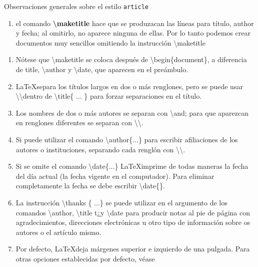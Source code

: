 \documentclass[12pt]{book}
\begin{document}
Observaciones generales sobre el estilo {\tt article}
\begin{multicols}{2}
\begin{enumerate}
    \item[\HandCuffRight] el comando {\bf \textbackslash maketitle} hace que se produzacan las líneas para título, author y fecha; al omitirlo, no aparece
    ninguna de ellas. Por lo tanto podemos crear documentos muy sencillos omitiendo la instrucción \textbackslash maketitle
\end{enumerate}
\end{multicols}

\newpage {}
\begin{multicols}{2}
\begin{enumerate}
    \item[\HandCuffRight] Nótese \hspace{0.5cm}
    que \hspace{0.5cm} \textbackslash maketitle se
    coloca \hspace{0.5cm} después \hspace{2pt} de
    \textbackslash begin\{document\}, a diferencia de title, \textbackslash author y \textbackslash date,
    que aparecen en el preámbulo.
    \item[\HandCuffRight] \LaTeX separa los títulos largos en dos o más renglones, pero se puede usar \textbackslash \textbackslash dentro de
    \textbackslash title\{ ... \} para forzar separaciones en el título.
    \item[\HandCuffRight] Los nombres de dos o más autores se separan con \textbackslash and; para que aparezcan en renglones diferentes se separan con \textbackslash \textbackslash .
    \item[\HandCuffRight] Si puede utilizar el comando \textbackslash author\{...\} para escribir afiliaciones de los autores o instituciones, separando cada renglón con \textbackslash \textbackslash. 
    \item[\HandCuffRight] Si \hspace{2pt} se \hspace{2pt} omite el comando \textbackslash date\{...\} \LaTeX imprime de todas maneras la fecha del día actual (la fecha vigente en el computador). Para eliminar completamente la fecha se debe escribir \textbackslash date\{\}.
    \item[\HandCuffRight] La instrucción \textbackslash thanks \{ ...\} se puede utilizar en el argumento de los comandos \textbackslash author, \textbackslash title t¿y \textbackslash date para producir notas al pie de página con agradecimientos, \hspace{2pt} direcciones electrónicas u otro tipo de información sobre os autores o el artículo mismo.   \vspace{1cm} \item[\HandCuffRight] Por defecto, \LaTeX deja márgenes superior e izquierdo de una pulgada. Para otras opciones establecidas por defecto, véase

\end{enumerate}
\end{multicols}
\end{document}
